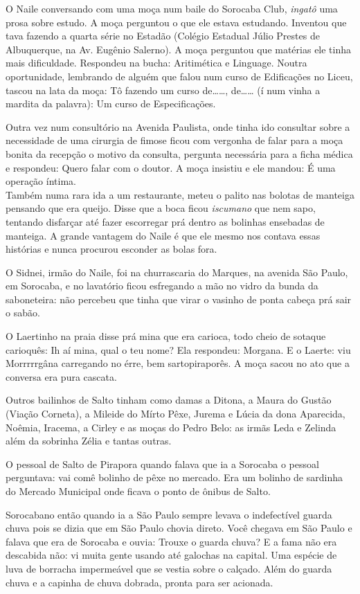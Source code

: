 \documentclass[12pt,brazil,]{book}
\begin{document}
O Naile conversando com uma moça num baile do Sorocaba Club,
\emph{ingatô} uma prosa sobre estudo. A moça perguntou o que ele estava
estudando. Inventou que tava fazendo a quarta série no Estadão (Colégio
Estadual Júlio Prestes de Albuquerque, na Av. Eugênio Salerno). A moça
perguntou que matérias ele tinha mais dificuldade. Respondeu na bucha:
Aritimética e Linguage. Noutra oportunidade, lembrando de alguém que
falou num curso de Edificações no Liceu, tascou na lata da moça: Tô
fazendo um curso de\ldots{}\ldots{}, de\ldots{}\ldots{} (í num vinha a
mardita da palavra): Um curso de Especificações.

Outra vez num consultório na Avenida Paulista, onde tinha ido consultar
sobre a necessidade de uma cirurgia de fimose ficou com vergonha de
falar para a moça bonita da recepção o motivo da consulta, pergunta
necessária para a ficha médica e respondeu: Quero falar com o doutor. A
moça insistiu e ele mandou: É uma operação íntima.\\
Também numa rara ida a um restaurante, meteu o palito nas bolotas de
manteiga pensando que era queijo. Disse que a boca ficou \emph{iscumano}
que nem sapo, tentando disfarçar até fazer escorregar prá dentro as
bolinhas ensebadas de manteiga. A grande vantagem do Naile é que ele
mesmo nos contava essas histórias e nunca procurou esconder as bolas
fora.

O Sidnei, irmão do Naile, foi na churrascaria do Marques, na avenida São
Paulo, em Sorocaba, e no lavatório ficou esfregando a mão no vidro da
bunda da saboneteira: não percebeu que tinha que virar o vasinho de
ponta cabeça prá sair o sabão.

O Laertinho na praia disse prá mina que era carioca, todo cheio de
sotaque carioquês: Ih aí mina, qual o teu nome? Ela respondeu: Morgana.
E o Laerte: viu Morrrrrgâna carregando no érre, bem sartopiraporês. A
moça sacou no ato que a conversa era pura cascata.

Outros bailinhos de Salto tinham como damas a Ditona, a Maura do Gustão
(Viação Corneta), a Mileide do Mírto Pêxe, Jurema e Lúcia da dona
Aparecida, Noêmia, Iracema, a Cirley e as moças do Pedro Belo: as irmãs
Leda e Zelinda além da sobrinha Zélia e tantas outras.

O pessoal de Salto de Pirapora quando falava que ia a Sorocaba o pessoal
perguntava: vai comê bolinho de pêxe no mercado. Era um bolinho de
sardinha do Mercado Municipal onde ficava o ponto de ônibus de Salto.

Sorocabano então quando ia a São Paulo sempre levava o indefectível
guarda chuva pois se dizia que em São Paulo chovia direto. Você chegava
em São Paulo e falava que era de Sorocaba e ouvia: Trouxe o guarda
chuva? E a fama não era descabida não: vi muita gente usando até
galochas na capital. Uma espécie de luva de borracha impermeável que se
vestia sobre o calçado. Além do guarda chuva e a capinha de chuva
dobrada, pronta para ser acionada.
\end{document}
